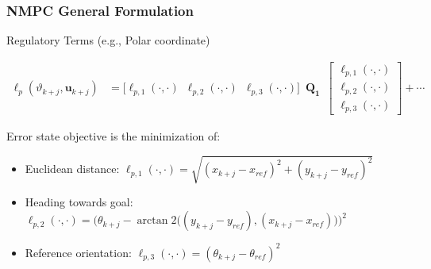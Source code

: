 
	\begin{frame}
		\frametitle{NMPC General Formulation}
		\begin{block}{Regulatory Terms (e.g., Polar coordinate)}
			\parbox[c][4\baselineskip][t]{\textwidth}{
			\begin{align*}
				\ell_p (\vartheta_{k + j},\mathbf{u}_{k + j}) &= 
				\pmb{[} \ell_{p,1}(\cdot,\cdot) \enspace \ell_{p,2}(\cdot,\cdot) \enspace \ell_{p,3}(\cdot,\cdot) \pmb{]}
				\enspace
				\mathbf{Q_1} \enspace
				\begin{bmatrix}
					\ell_{p,1}(\cdot,\cdot) \\
					\ell_{p,2}(\cdot,\cdot) \\
					\ell_{p,3}(\cdot,\cdot)
				\end{bmatrix}
				+ \cdots
			\end{align*}
			}
		\end{block}
		Error state objective is the minimization of: \\[0.5cm]
		\begin{itemize}
			\item Euclidean distance: $\ell_{p,1}(\cdot,\cdot) = \sqrt{(x_{k+j} - x_{ref})^2+(y_{k+j} - y_{ref})^2}$ \\ [0.2cm]
			\item Heading towards goal: $\ell_{p,2}(\cdot,\cdot) = \Big(\theta_{k+j} - \arctan2\big((y_{k+j} - y_{ref}),(x_{k+j} - x_{ref})\big)\Big)^2$ \\ [0.2cm]
			\item Reference orientation: $\ell_{p,3}(\cdot,\cdot) = (\theta_{k+j} - \theta_{ref})^2$
		\end{itemize}
	\end{frame}


